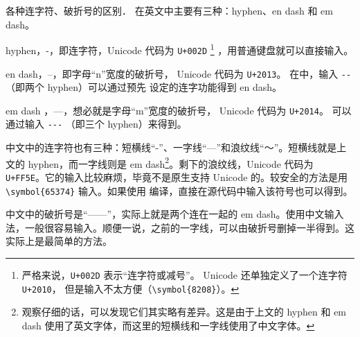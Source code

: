 \begin{myQA}{各种连字符、破折号的区别．}
	在英文中主要有三种：hyphen、en dash 和 em dash。
	
	\begin{myItemize}
		\item  hyphen，-，即连字符，Unicode 代码为 \verb|U+002D|
			\footnote{严格来说，\verb|U+002D| 表示“连字符或减号”。
				Unicode 还单独定义了一个连字符 \verb|U+2010|，
				但是输入不太方便（\verb|\symbol{8208}|）。}
			，用普通键盘就可以直接输入。
		\item en dash，--，即字母“n”宽度的破折号，
			Unicode 代码为 \verb|U+2013|。
			在\LaTeXTeX 中，输入 \verb|--| （即两个 hyphen）可以通过预先
			设定的连字功能得到 en dash。
		\item em dash ，---，想必就是字母“m”宽度的破折号，
			Unicode 代码为 \verb|U+2014|。
			可以通过输入 \verb|---| （即三个 hyphen）来得到。
	\end{myItemize}
	
	\blankline
	
	中文中的连字符也有三种：短横线“{\Songti -}”、一字线“—”和浪纹线“～”。短横线就是上文的 hyphen，而一字线则是 em dash\footnote{观察仔细的话，可以发现它们其实略有差异。这是由于上文的 hyphen 和 em dash 使用了英文字体，而这里的短横线和一字线使用了中文字体。}。剩下的浪纹线，Unicode 代码为 \verb|U+FF5E|。它的输入比较麻烦，毕竟\LaTeXTeX 不是原生支持 Unicode 的。较安全的方法是用 \verb|\symbol{65374}| 输入。如果使用  编译，直接在源代码中输入该符号也可以得到。
	
	中文中的破折号是“——”，实际上就是两个连在一起的 em dash。使用中文输入法，一般很容易输入。顺便一说，之前的一字线，可以由破折号删掉一半得到。这实际上是最简单的方法。
\end{myQA}

